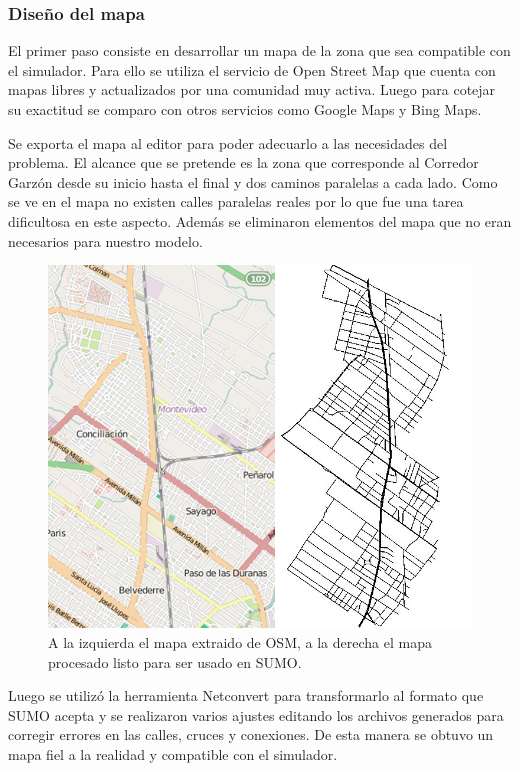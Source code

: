 \subsubsection{Diseño del mapa}

El primer paso consiste en desarrollar un mapa de la zona que sea compatible con el simulador. Para ello se utiliza el servicio de Open Street Map \citep{OSM} que cuenta con mapas libres y actualizados por una comunidad muy activa. Luego para cotejar su exactitud se comparo con otros servicios como Google Maps y Bing Maps.

Se exporta el mapa al editor \citet{JOSM} para poder adecuarlo a las necesidades del problema. El alcance que se pretende es la zona que corresponde al Corredor Garzón desde su inicio hasta el final y dos caminos paralelas a cada lado. Como se ve en el mapa no existen calles paralelas reales por lo que fue una tarea dificultosa en este aspecto. Además se eliminaron elementos del mapa que no eran necesarios para nuestro modelo. 

\begin{figure}[H]
	\centering
	\includegraphics[width=0.7\linewidth]{Figures/mapa_osm_sumo}
	\caption{A la izquierda el mapa extraido de OSM, a la derecha el mapa procesado listo para ser usado en SUMO.}
	\label{fig:mapa_osm_sumo}
\end{figure}

Luego se utilizó la herramienta Netconvert para transformarlo al formato que SUMO acepta y se realizaron varios ajustes editando los archivos generados para corregir errores en las calles, cruces y conexiones. De esta manera se obtuvo un mapa fiel a la realidad y compatible con el simulador.





